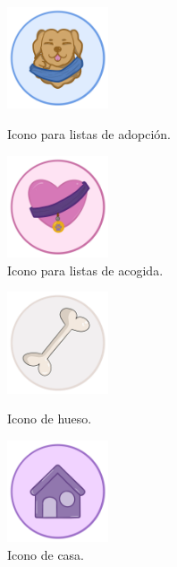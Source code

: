 \documentclass[a4paper, 12pt]{article}
\begin{document}
\begin{figure}[H]
   	\begin{minipage}{0.48\textwidth}
		\begin{center}
			{\includegraphics[width=3cm]{logo/Adoptar.png}\par}
			\caption{Icono para listas de adopción.}
		\end{center}  
	\end{minipage}\hfill
   	\begin{minipage}{0.48\textwidth}
		\begin{center}
			{\includegraphics[width=3cm]{logo/Acoger.png}\par}
			\caption{Icono para listas de acogida.}
		\end{center}  
	\end{minipage}\hfill
\end{figure}

\begin{figure}[H]
   	\begin{minipage}{0.48\textwidth}
		\begin{center}
			{\includegraphics[width=3cm]{logo/Protectora.png}\par}
			\caption{Icono de hueso.}
		\end{center}  
	\end{minipage}\hfill
   	\begin{minipage}{0.48\textwidth}
		\begin{center}
			{\includegraphics[width=3cm]{logo/Casa.png}\par}
			\caption{Icono de casa.}
		\end{center}  
	\end{minipage}\hfill
\end{figure}
\end{document}
